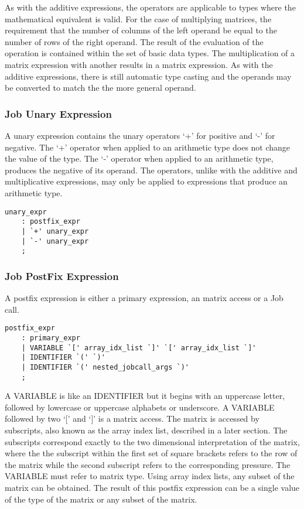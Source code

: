 \documentclass[prodmode,acmtecs]{acmsmall}
\begin{document}
As with the additive expressions, the operators are applicable to types
where the mathematical equivalent is valid. For the case of multiplying
matrices, the requirement that the number of columns of the left operand 
be equal to the number of rows of the right operand. The result of the
evaluation of the operation is contained within the set of basic data 
types. The multiplication of a matrix expression with another results in 
a matrix expression. As with the additive expressions, there is still 
automatic type casting and the operands may be converted to match the
the more general operand. 
\medskip

\subsubsection{Job Unary Expression}
  
A unary expression contains the unary operators `+' for positive and `-' 
for negative. The `+' operator when applied to an arithmetic type does
not change the value of the type. The `-' operator when applied to an
arithmetic type, produces the negative of its operand. The operators, 
unlike with the additive and multiplicative expressions, may only be
applied to expressions that produce an arithmetic type.


\begin{lstlisting}
unary_expr
	: postfix_expr
	| `+' unary_expr
	| `-' unary_expr
	;
\end{lstlisting}
\medskip

\subsubsection{Job PostFix Expression}

A postfix expression is either a primary expression, an matrix access or 
a Job call.

\begin{lstlisting}
postfix_expr
	: primary_expr
	| VARIABLE `[' array_idx_list `]' `[' array_idx_list `]'
	| IDENTIFIER `(' `)'
	| IDENTIFIER `(' nested_jobcall_args `)'
	;
\end{lstlisting}

A VARIABLE is like an IDENTIFIER but it begins with an uppercase letter,
followed by lowercase or uppercase alphabets or underscore. A VARIABLE
followed by two `[' and `]' is a matrix access. The matrix is accessed
by subscripts, also known as the array index list, described in a later
section. The subscripts correspond exactly to the two dimensional 
interpretation of the matrix, where the the subscript within the first 
set of square brackets refers to the row of the matrix while the second
subscript refers to the corresponding pressure. The VARIABLE must refer 
to matrix type. Using array index lists, any subset of the matrix can be
obtained. The result of this postfix expression can be a single value of
the type of the matrix or any subset of the matrix.
\end{document}
